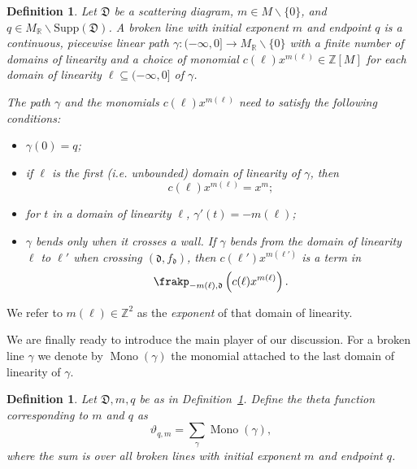 \documentclass[11pt]{amsart}
\newtheorem{defn}[theorem]{Definition}
\theoremstyle{remark}
\numberwithin{equation}{section}
\newcommand{\RR}{\mathbb{R}}
\newcommand{\ZZ}{\mathbb{Z}}
\newcommand{\fd}{\mathfrak{d}}
\newcommand{\fD}{\mathfrak{D}}
\newcommand{\Mono}{\operatorname{Mono}}
\begin{document}
\begin{defn} 
  \label{brokendef}
  Let $\fD$ be a scattering diagram, $m \in M \smallsetminus \{0\}$, and $q \in
  M_{\RR} \smallsetminus \text{Supp}(\fD)$.  A \emph{broken line} with initial
  \emph{exponent} $m$ and endpoint $q$ is a continuous, piecewise linear path
  $\gamma : ( - \infty , 0] \rightarrow M_{\mathbb{R}} \smallsetminus \{ 0\} $ with
  a finite number of domains of linearity and a choice of monomial
  $c(\ell) x^{m(\ell)} \in \ZZ[M]$ for each domain of linearity $\ell \subseteq ( -
  \infty, 0]$ of $\gamma$. 
  
  The path $\gamma$ and the monomials $c(\ell) x^{m(\ell)}$ need to satisfy the
  following conditions:
  \begin{itemize}
    \item $\gamma(0) = q$;
    \item if $\ell$ is the first (i.e. unbounded) domain of linearity of $\gamma$, then 
      \[c(\ell) x^{m(\ell)} = x^{m};\]
    \item for $t$ in a domain of linearity $\ell$, $\gamma'(t) = -m(\ell)$;
    \item $\gamma$ bends only when it crosses a wall. If $\gamma$ bends from the
      domain of linearity $\ell$ to $ \ell'$ when crossing $(\fd, f_{\fd})$, then
      $c(\ell')x^{m(\ell')}$ is a term in 
      \[\frakp_{-m(\ell), \fd} \left(c(\ell) x^{m(\ell)}\right).\]
  \end{itemize}
\end{defn}
We refer to $m(\ell)\in \mathbb{Z}^2$ as the \emph{exponent} of that domain
of linearity.

We are finally ready to introduce the main player of our discussion.
For a broken line $\gamma$ we denote by $\Mono(\gamma)$ the monomial attached to the last domain of linearity of $\gamma$.
\begin{defn}
  Let $\fD, m, q$ be as in Definition~\ref{brokendef}.  Define the \emph{theta function} corresponding to $m$ and $q$
  as
  \[ 
    \vartheta_{q, m} = \sum_{\gamma} \Mono (\gamma), 
  \] 
  where the sum is over all broken lines with initial exponent $m$ and endpoint
  $q$.
\end{defn}
\end{document}
